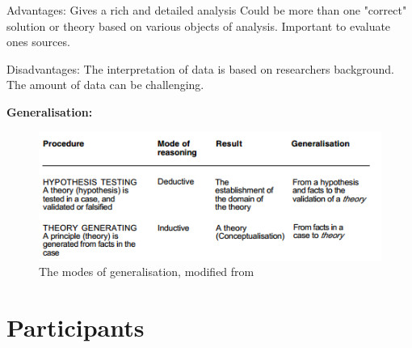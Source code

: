 Advantages:
Gives a rich and detailed analysis
Could be more than one "correct" solution or theory based on various objects of analysis.
Important to evaluate ones sources.

Disadvantages:
The interpretation of data is based on researchers background.
The amount of data can be challenging.

\textbf{Generalisation:}


\begin{figure}[H]
\begin{center}
\includegraphics[scale=0.9]{ModesOfGeneralisation.png}
\caption[The modes of generalisation]{The modes of generalisation, modified from \cite{johansson2003case}}
\label{fig:modesofgeneralisation}
\end{center}
\end{figure}

\section{Participants}

